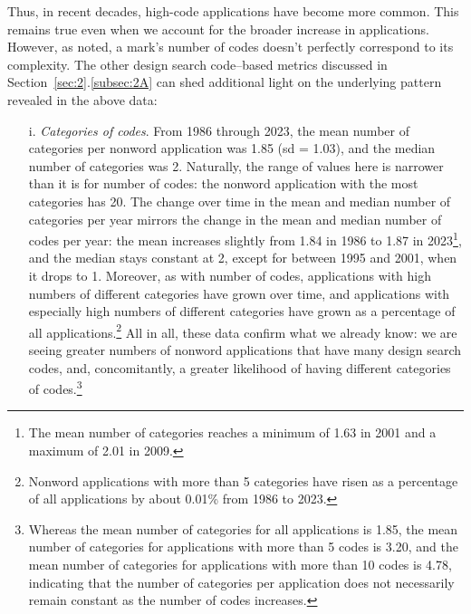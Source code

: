 \documentclass[letterpaper, 11pt, oneside]{article}
\begin{document}
Thus, in recent decades, high-code applications have become more common. This remains true even when we account for the broader increase in applications. However, as noted, a mark's number of codes doesn't perfectly correspond to its complexity. The other design search code–based metrics discussed in Section~\ref{sec:2}.\ref{subsec:2A} can shed additional light on the underlying pattern revealed in the above data:

\begin{enumerate}

\item[i.] \textit{Categories of codes}. From 1986 through 2023, the mean number of categories per nonword application was 1.85 (sd = 1.03), and the median number of categories was 2. Naturally, the range of values here is narrower than it is for number of codes: the nonword application with the most categories has 20. The change over time in the mean and median number of categories per year mirrors the change in the mean and median number of codes per year: the mean increases slightly from 1.84 in 1986 to 1.87 in 2023\footnote{The mean number of categories reaches a minimum of 1.63 in 2001 and a maximum of 2.01 in 2009.}, and the median stays constant at 2, except for between 1995 and 2001, when it drops to 1. Moreover, as with number of codes, applications with high numbers of different categories have grown over time, and applications with especially high numbers of different categories have grown as a percentage of all applications.\footnote{Nonword applications with more than 5 categories have risen as a percentage of all applications by about 0.01\% from 1986 to 2023.} All in all, these data confirm what we already know: we are seeing greater numbers of nonword applications that have many design search codes, and, concomitantly, a greater likelihood of having different categories of codes.\footnote{Whereas the mean number of categories for all applications is 1.85, the mean number of categories for applications with more than 5 codes is 3.20, and the mean number of categories for applications with more than 10 codes is 4.78, indicating that the number of categories per application does not necessarily remain constant as the number of codes increases.}


\end{enumerate}
\end{document}
